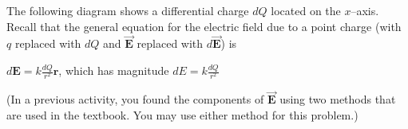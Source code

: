 \documentclass{article}
\newcommand{\bfvec}[1]{\vec{\mathbf{#1}}}
\begin{document}
The following diagram shows a differential charge $dQ$ located on the $x$--axis. Recall that the general equation for the electric field due to a point charge (with $q$ replaced with $dQ$ and $\bfvec{E}$ replaced with $d\bfvec{E}$) is

$\displaystyle d\mathbf{E} =k\frac{dQ}{r^2}\hat{\mathbf{r}}$, which has magnitude $\displaystyle dE = k\frac{dQ}{r^2}$

(In a previous activity, you found the components of $\bfvec{E}$ using two methods that are used in the textbook. You may use either method for this problem.)

\ifsolutions


\else

\newpage


\fi
\ifsolutions\else
\newpage

  
\fi
\end{document}
